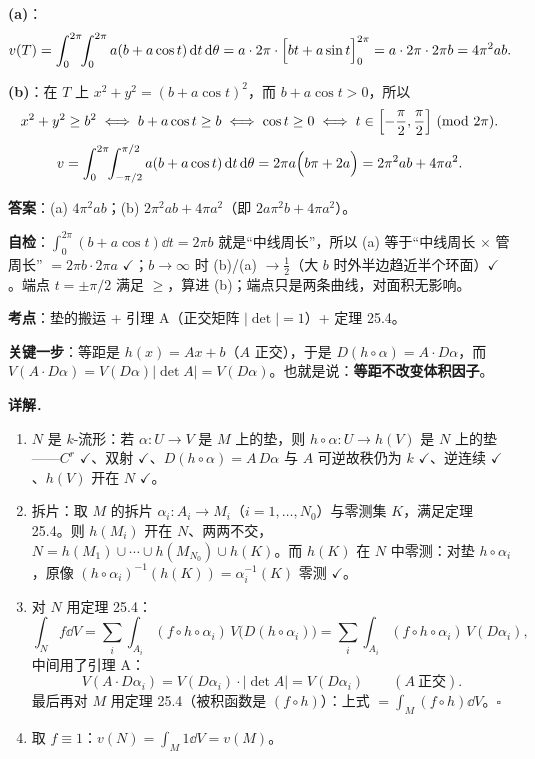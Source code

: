 \documentclass[11pt]{ctexart}
\renewcommand{\qbreak}{\needspace{0.22\textheight}}
\newcommand{\Vvol}{V}
\begin{document}
\textbf{(a)}：
\[ v(T)=\int_0^{2\pi}\!\!\int_0^{2\pi}a(b+a\cos t)\,\mathrm{d} t\,\mathrm{d}\theta=a\cdot2\pi\cdot\Bigl[bt+a\sin t\Bigr]_0^{2\pi}=a\cdot2\pi\cdot2\pi b=4\pi^2ab. \]

\textbf{(b)}：在 $T$ 上 $x^2+y^2=(b+a\cos t)^2$，而 $b+a\cos t>0$，所以
\[ x^2+y^2\ge b^2\iff b+a\cos t\ge b\iff\cos t\ge0\iff t\in\Bigl[-\frac{\pi}{2},\frac{\pi}{2}\Bigr]\ (\mathrm{mod}\ 2\pi). \]
\[ v=\int_0^{2\pi}\!\!\int_{-\pi/2}^{\pi/2}a(b+a\cos t)\,\mathrm{d} t\,\mathrm{d}\theta=2\pi a\Bigl(b\pi+2a\Bigr)=2\pi^2ab+4\pi a^2. \]

\textbf{答案}：(a) $4\pi^2ab$；(b) $2\pi^2ab+4\pi a^2$（即 $2a\pi^2b+4\pi a^2$）。

\textbf{自检}：$\int_0^{2\pi}(b+a\cos t)\dd t=2\pi b$ 就是“中线周长”，所以 (a) 等于“中线周长 $\times$ 管周长” $=2\pi b\cdot2\pi a$ $\checkmark$；$b\to\infty$ 时 (b)/(a) $\to\frac12$（大 $b$ 时外半边趋近半个环面）$\checkmark$。端点 $t=\pm\pi/2$ 满足 $\ge$，算进 (b)；端点只是两条曲线，对面积无影响。

\qbreak
{}\label{ax10}

\textbf{考点}：垫的搬运 + 引理 A（正交矩阵 $|\det|=1$）+ 定理 25.4。

\textbf{关键一步}：等距是 $h(x)=Ax+b$（$A$ 正交），于是 $D(h\circ\alpha)=A\cdot D\alpha$，而 $\Vvol(A\cdot D\alpha)=\Vvol(D\alpha)|\det A|=\Vvol(D\alpha)$。也就是说：\textbf{等距不改变体积因子}。

\textbf{详解}．
\begin{enumerate}
  \item $N$ 是 $k$-流形：若 $\alpha:U\to V$ 是 $M$ 上的垫，则 $h\circ\alpha:U\to h(V)$ 是 $N$ 上的垫——$C^r$ $\checkmark$、双射 $\checkmark$、$D(h\circ\alpha)=A\,D\alpha$ 与 $A$ 可逆故秩仍为 $k$ $\checkmark$、逆连续 $\checkmark$、$h(V)$ 开在 $N$ $\checkmark$。
  \item 拆片：取 $M$ 的拆片 $\alpha_i:A_i\to M_i$（$i=1,\dots,N_0$）与零测集 $K$，满足定理 25.4。则 $h(M_i)$ 开在 $N$、两两不交，$N=h(M_1)\cup\cdots\cup h(M_{N_0})\cup h(K)$。而 $h(K)$ 在 $N$ 中零测：对垫 $h\circ\alpha_i$，原像 $(h\circ\alpha_i)^{-1}(h(K))=\alpha_i^{-1}(K)$ 零测 $\checkmark$。
  \item 对 $N$ 用定理 25.4：
  \[ \int_Nf\dd V=\sum_i\int_{A_i}(f\circ h\circ\alpha_i)\,\Vvol\bigl(D(h\circ\alpha_i)\bigr)=\sum_i\int_{A_i}(f\circ h\circ\alpha_i)\,\Vvol(D\alpha_i), \]
  中间用了引理 A：
  \[ \Vvol(A\cdot D\alpha_i)=\Vvol(D\alpha_i)\cdot|\det A|=\Vvol(D\alpha_i)\qquad(A\ \text{正交}). \]
  最后再对 $M$ 用定理 25.4（被积函数是 $(f\circ h)$）：上式 $=\int_M(f\circ h)\dd V$。$\square$
  \item 取 $f\equiv1$：$v(N)=\int_M1\dd V=v(M)$。
\end{enumerate}
\end{document}
